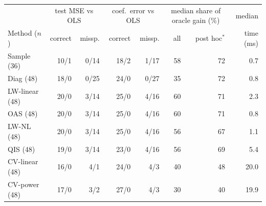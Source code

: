 \begin{tabular}{@{}lrrrrrrr@{}}
\toprule
 & \multicolumn{2}{c}{test MSE vs OLS} & \multicolumn{2}{c}{coef.\ error vs OLS} & \multicolumn{2}{c}{median share of oracle gain (\%)} & median \\
Method ($n$) & correct & missp. & correct & missp. & all & post hoc$^{\ast}$ & time (ms) \\
\midrule
Sample (36) & 10/1 & 0/14 & 18/2 & 1/17 & 58 & 72 & 0.7 \\
Diag (48) & 18/0 & 0/25 & 24/0 & 0/27 & 35 & 72 & 0.8 \\
LW-linear (48) & 20/0 & 3/14 & 25/0 & 4/16 & 60 & 71 & 2.3 \\
OAS (48) & 20/0 & 3/14 & 25/0 & 4/16 & 60 & 71 & 0.8 \\
LW-NL (48) & 20/0 & 3/14 & 25/0 & 4/16 & 56 & 67 & 1.1 \\
QIS (48) & 19/0 & 3/14 & 23/0 & 4/16 & 56 & 69 & 5.4 \\
CV-linear (48) & 16/0 & 4/1 & 24/0 & 4/3 & 40 & 48 & 20.0 \\
CV-power (48) & 17/0 & 3/2 & 27/0 & 4/3 & 30 & 40 & 19.9 \\
\bottomrule
\end{tabular}